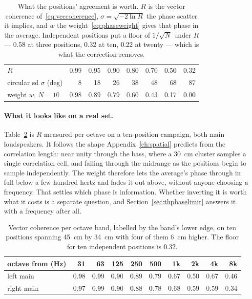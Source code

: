 \begin{table}[ht]
\centering
\renewcommand{\arraystretch}{1.2}
\begin{tabular}{lrrrrrrr}
\toprule
$R$                        & 0.99 & 0.95 & 0.90 & 0.80 & 0.70 & 0.50 & 0.32\\
circular sd $\sigma$ (deg) &    8 &   18 &   26 &   38 &   48 &   68 &   87\\
weight $w$, $N=10$         & 0.98 & 0.89 & 0.79 & 0.60 & 0.43 & 0.17 & 0.00\\
\bottomrule
\end{tabular}
\caption{What the positions' agreement is worth. $R$ is the vector coherence
of~\eqref{eq:veccoherence}, $\sigma=\sqrt{-2\ln R}$ the phase scatter it
implies, and $w$ the weight~\eqref{eq:phaseweight} gives that phase in the
average. Independent positions put a floor of $1/\sqrt N$ under $R$ --- 0.58 at
three positions, 0.32 at ten, 0.22 at twenty --- which is what the correction
removes.}
\label{tab:coherence}
\end{table}

\paragraph{What it looks like on a real set.} Table~\ref{tab:measuredcoherence} is $R$ measured per octave on a ten-position campaign, both main loudspeakers. It follows the shape Appendix~\ref{ch:spatial} predicts from the correlation length: near unity through the bass, where a \SI{30}{\centi\metre} cluster samples a single correlation cell, and falling through the midrange as the positions begin to sample independently. The weight therefore lets the average's phase through in full below a few hundred hertz and fades it out above, without anyone choosing a frequency. That settles which phase is information. Whether inverting it is worth what it costs is a separate question, and Section~\ref{sec:thphaselimit} answers it with a frequency after all.

\begin{table}[ht]
\centering
\renewcommand{\arraystretch}{1.2}
\small
\begin{tabular}{lrrrrrrrrr}
\toprule
octave from (Hz) & 31 & 63 & 125 & 250 & 500 & 1k & 2k & 4k & 8k\\
\midrule
left main   & 0.98 & 0.99 & 0.90 & 0.89 & 0.79 & 0.67 & 0.50 & 0.67 & 0.46\\
right main  & 0.97 & 0.99 & 0.90 & 0.88 & 0.78 & 0.68 & 0.59 & 0.59 & 0.34\\
\bottomrule
\end{tabular}
\caption{Vector coherence per octave band, labelled by the band's lower edge,
on ten positions spanning \SI{45}{\centi\metre} by \SI{34}{\centi\metre}
with four of them \SI{6}{\centi\metre} higher. The floor for ten independent
positions is 0.32.}
\label{tab:measuredcoherence}
\end{table}

